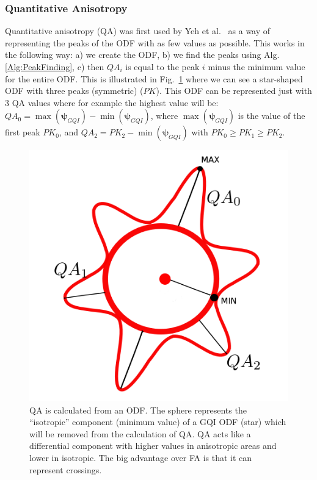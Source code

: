 \documentclass{bioinfo}
\begin{document}
\subsubsection{Quantitative Anisotropy\label{sub:Quantitative-Anisotropy}}

Quantitative anisotropy (QA) was first used by Yeh et al.~\cite{Yeh2010}
as a way of representing the peaks of the ODF with as few values as
possible. This works in the following way: a) we create the ODF, b)
we find the peaks using Alg. \ref{Alg:PeakFinding}, c) then $QA_{i}$
is equal to the peak $i$ minus the minimum value for the entire ODF.
This is illustrated in Fig.~\ref{Flo:QA_sketch} where we can see
a star-shaped ODF with three peaks (symmetric) ($PK$). This ODF can
be represented just with $3$ QA values where for example the highest
value will be: $QA_{0}=\max(\bm{\psi}_{GQI})-\min(\bm{\psi}_{GQI})$,
where $\max(\bm{\psi}_{GQI})$ is the value of the first peak $PK_{0}$,
and $QA_{2}=PK_{2}-\min(\bm{\psi}_{GQI})$ with $PK_{0}\geq PK_{1}\geq PK_{2}$.

%
\begin{figure}
[th!]

\begin{centering}
\includegraphics[scale=0.6]{figures/QA}
\par\end{centering}

\caption{QA is calculated from an ODF. The sphere represents the {}``isotropic''
component (minimum value) of a GQI ODF (star) which will be removed
from the calculation of QA. QA acts like a differential component
with higher values in anisotropic areas and lower in isotropic. The
big advantage over FA is that it can represent crossings.}


\label{Flo:QA_sketch}
\end{figure}
\end{document}
